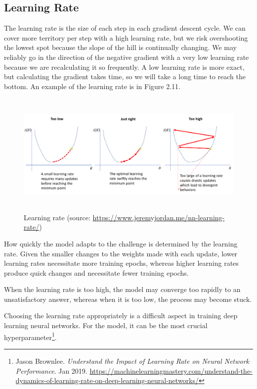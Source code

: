 \subsection{Learning Rate}
\label{subsec:learning_rate}
\hspace{0.5cm}The learning rate is the size of each step in each gradient descent cycle. We can cover more territory per step with a high learning rate, but we risk overshooting the lowest spot because the slope of the hill is continually changing. We may reliably go in the direction of the negative gradient with a very low learning rate because we are recalculating it so frequently. A low learning rate is more exact, but calculating the gradient takes time, so we will take a long time to reach the bottom. An example of the learning rate is in Figure 2.11.
\begin{figure}[ht]
	\centering
	\includegraphics[width=\linewidth, height=6cm,keepaspectratio]{figures/learning rate.png}
   \caption{Learning rate (source: \url{https://www.jeremyjordan.me/nn-learning-rate/})}
\end{figure}

How quickly the model adapts to the challenge is determined by the learning rate. Given the smaller changes to the weights made with each update, lower learning rates necessitate more training epochs, whereas higher learning rates produce quick changes and necessitate fewer training epochs.

When the learning rate is too high, the model may converge too rapidly to an unsatisfactory answer, whereas when it is too low, the process may become stuck.

Choosing the learning rate appropriately is a difficult aspect in training deep learning neural networks. For the model, it can be the most crucial hyperparameter\footnote{Jason Brownlee. \textit{Understand the Impact of Learning Rate on Neural Network Performance}. Jan 2019. \url{https://machinelearningmastery.com/understand-the-dynamics-of-learning-rate-on-deep-learning-neural-networks/}}.

